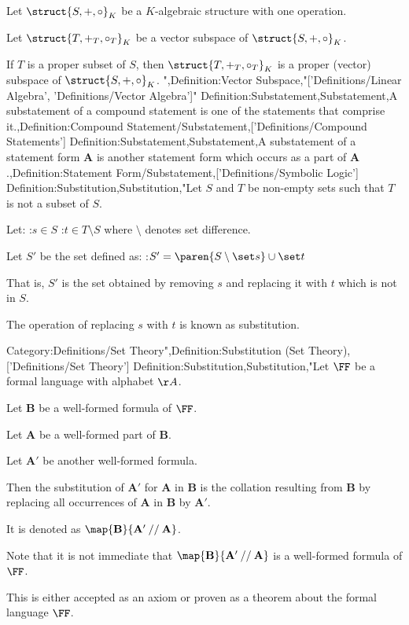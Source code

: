 Let $\struct {S, +, \circ}_K$ be a $K$-algebraic structure with one operation.

Let $\struct {T, +_T, \circ_T}_K$ be a vector subspace of $\struct {S, +, \circ}_K$.


If $T$ is a proper subset of $S$, then $\struct {T, +_T, \circ_T}_K$ is a proper (vector) subspace of $\struct {S, +, \circ}_K$.
",Definition:Vector Subspace,"['Definitions/Linear Algebra', 'Definitions/Vector Algebra']"
Definition:Substatement,Substatement,A substatement of a compound statement is one of the statements that comprise it.,Definition:Compound Statement/Substatement,['Definitions/Compound Statements']
Definition:Substatement,Substatement,A substatement of a statement form $\mathbf A$ is another statement form which occurs as a part of $\mathbf A$.,Definition:Statement Form/Substatement,['Definitions/Symbolic Logic']
Definition:Substitution,Substitution,"Let $S$ and $T$ be non-empty sets such that $T$ is not a subset of $S$.

Let:
:$s \in S$
:$t \in T \setminus S$
where $\setminus$ denotes set difference.

Let $S'$ be the set defined as:
:$S' = \paren {S \setminus \set s} \cup \set t$

That is, $S'$ is the set obtained by removing $s$ and replacing it with $t$ which is not in $S$.


The operation of replacing $s$ with $t$ is known as substitution.


Category:Definitions/Set Theory",Definition:Substitution (Set Theory),['Definitions/Set Theory']
Definition:Substitution,Substitution,"Let $\FF$ be a formal language with alphabet $\AA$.

Let $\mathbf B$ be a well-formed formula of $\FF$.

Let $\mathbf A$ be a well-formed part of $\mathbf B$.

Let $\mathbf A'$ be another well-formed formula.


Then the substitution of $\mathbf A'$ for $\mathbf A$ in $\mathbf B$ is the collation resulting from $\mathbf B$ by replacing all occurrences of $\mathbf A$ in $\mathbf B$ by $\mathbf A'$.

It is denoted as $\map {\mathbf B} {\mathbf A' \mathbin {//} \mathbf A}$.


Note that it is not immediate that $\map {\mathbf B} {\mathbf A' \mathbin {//} \mathbf A}$ is a well-formed formula of $\FF$.

This is either accepted as an axiom or proven as a theorem about the formal language $\FF$.


